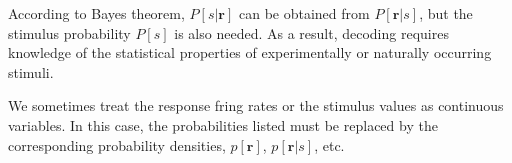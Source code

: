 \begin{rem}
  According to Bayes theorem,  $P[s|\mathbf{r}]$ can be obtained from $P[\mathbf{r}|s]$, but the stimulus probability $P[s]$ is also needed. As a result, decoding requires knowledge of the statistical properties of experimentally or naturally occurring stimuli.
\end{rem}

\begin{rem}
  We sometimes treat the response fring rates or the stimulus values as continuous variables. In this case, the probabilities listed must be replaced by
the corresponding probability densities,
$p[\mathbf{r}]$, $p[\mathbf{r}|s]$, etc.

\end{rem}


